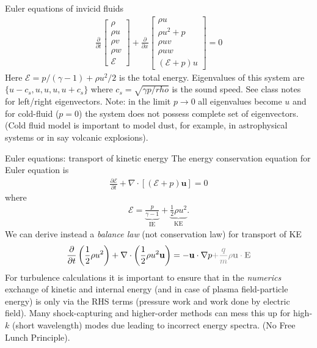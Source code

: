 \documentclass[aspectratio=169]{beamer}
\newcommand{\mypause}{}
\newcommand{\pfrac}[2]{\frac{\partial #1}{\partial #2}}
\newcommand{\mvec}[1]{\mathbf{#1}}
\theoremstyle{definition}
\begin{document}
\begin{frame}{Euler equations of invicid fluids}
  \begin{align*}
    \frac{\partial}{\partial{t}}    
    \left[
    \begin{matrix}
      \rho \\
      \rho u \\
      \rho v \\
      \rho w \\
      \mathcal{E}
    \end{matrix}
    \right]
    +
    \frac{\partial}{\partial{x}}
    \left[
    \begin{matrix}
      \rho u \\
      \rho u^2 + p \\
      \rho uv \\
      \rho uw \\
      (\mathcal{E}+p)u
    \end{matrix}
    \right]
    =
    0    
  \end{align*}
  Here $\mathcal{E} = p/(\gamma-1) + \rho u^2/2$ is the total
  energy. Eigenvalues of this system are $\{u-c_s,u,u,u,u+c_s \}$
  where $c_s = \sqrt{\gamma p/rho}$ is the sound speed. See class
  notes for left/right eigenvectors.%
  \vskip0.1in%
  Note: in the limit $p\rightarrow 0$ all eigenvalues become $u$ and
  for cold-fluid ($p=0$) the system does not possess complete set of
  eigenvectors. (Cold fluid model is important to model dust, for
  example, in astrophysical systems or in say volcanic explosions).
\end{frame}

\begin{frame}{Euler equations: transport of kinetic energy}
  \footnotesize%
  The energy conservation equation for Euler equation is
  \begin{align*}
    \pfrac{\mathcal{E}}{t} + \nabla\cdot\left[(\mathcal{E}+p)\mvec{u} \right] = 0
  \end{align*}
  where
  \begin{align*}
    \mathcal{E} =
    \underbrace{\frac{p}{\gamma-1}}_{\textrm{IE}} +
    \underbrace{\frac{1}{2}\rho u^2}_{\textrm{KE}}
    .
  \end{align*}
  \mypause%
  We can derive instead a \emph{balance law} (not conservation law)
  for transport of KE
  \begin{align*}
    \frac{\partial}{\partial t}\left(\frac{1}{2}\rho u^2 \right)
    +
    \nabla\cdot\left(\frac{1}{2}\rho u^2 \mvec{u} \right)
    =
    -\mvec{u}\cdot\nabla p
    \color{gray}{ + \frac{q}{m}\rho \mvec{u}\cdot\mvec{\mvec{E}}}
  \end{align*}
  \mypause%
  For turbulence calculations it is important to ensure that in the
  \emph{numerics} exchange of kinetic and internal energy (and in case
  of plasma field-particle energy) is only via the RHS terms (pressure
  work and work done by electric field).%
  \vskip0.1in%
  Many shock-capturing and higher-order methods can mess this up for
  high-$k$ (short wavelength) modes due leading to incorrect energy
  spectra. (No Free Lunch Principle).
\end{frame}
\end{document}
